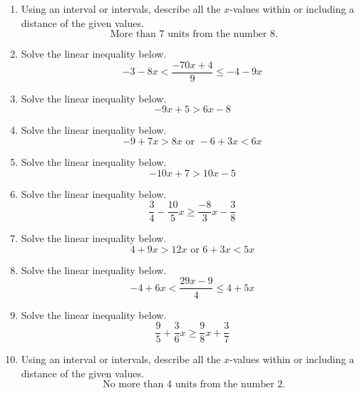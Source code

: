 \documentclass[14pt]{extbook}
\begin{document}
\begin{enumerate}
\item{
Using an interval or intervals, describe all the $x$-values within or including a distance of the given values.\[ \text{ More than } 7 \text{ units from the number } 8. \]} \newpage
\item{
Solve the linear inequality below.\[ -3 - 8 x < \frac{-70 x + 4}{9} \leq -4 - 9 x \]} \newpage
\item{
Solve the linear inequality below.\[ -9x + 5 > 6x -8 \]} \newpage
\item{
Solve the linear inequality below.\[ -9 + 7 x > 8 x \text{ or } -6 + 3 x < 6 x \]} \newpage
\item{
Solve the linear inequality below.\[ -10x + 7 > 10x -5 \]} \newpage
\item{
Solve the linear inequality below.\[ \frac{3}{4} - \frac{10}{5} x \geq \frac{-8}{3} x - \frac{3}{8} \]} \newpage
\item{
Solve the linear inequality below.\[ 4 + 9 x > 12 x \text{ or } 6 + 3 x < 5 x \]} \newpage
\item{
Solve the linear inequality below.\[ -4 + 6 x < \frac{29 x - 9}{4} \leq 4 + 5 x \]} \newpage
\item{
Solve the linear inequality below.\[ \frac{9}{5} + \frac{3}{6} x \geq \frac{9}{8} x + \frac{3}{7} \]} \newpage
\item{
Using an interval or intervals, describe all the $x$-values within or including a distance of the given values.\[ \text{ No more than } 4 \text{ units from the number } 2. \]} \newpage
\end{enumerate}
\end{document}
